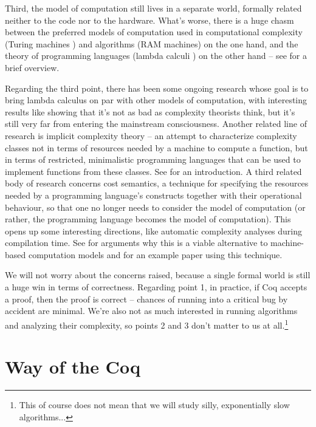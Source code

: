 \documentclass[declaration,mgr,english,shortabstract]{iithesis}
\begin{document}
Third, the model of computation still lives in a separate world, formally related neither to the code nor to the hardware. What's worse, there is a huge chasm between the preferred models of computation used in computational complexity (Turing machines \cite{Turing}) and algorithms (RAM machines) on the one hand, and the theory of programming languages (lambda calculi \cite{Church}) on the other hand -- see \cite{OtherTuringMachine} for a brief overview.

Regarding the third point, there has been some ongoing research whose goal is to bring lambda calculus on par with other models of computation, with interesting results like \cite{ReasonableMachine} showing that it's not as bad as complexity theorists think, but it's still very far from entering the mainstream consciousness. Another related line of research is implicit complexity theory -- an attempt to characterize complexity classes not in terms of resources needed by a machine to compute a function, but in terms of restricted, minimalistic programming languages that can be used to implement functions from these classes. See \cite{ICC1} \cite{ICC2} for an introduction. A third related body of research concerns cost semantics, a technique for specifying the resources needed by a programming language's constructs together with their operational behaviour, so that one no longer needs to consider the model of computation (or rather, the programming language becomes the model of computation). This opens up some interesting directions, like automatic complexity analyses during compilation time. See \cite{CostSemanticsBlog} for arguments why this is a viable alternative to machine-based computation models and \cite{CostSemantics} for an example paper using this technique.

We will not worry about the concerns raised, because a single formal world is still a huge win in terms of correctness. Regarding point 1, in practice, if Coq accepts a proof, then the proof is correct -- chances of running into a critical bug by accident are minimal. We're also not as much interested in running algorithms and analyzing their complexity, so points 2 and 3 don't matter to us at all.\footnote{This of course does not mean that we will study silly, exponentially slow algorithms...}

\section{Way of the Coq} \label{ch1s5}
\end{document}
